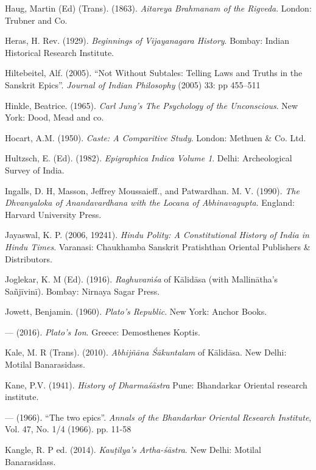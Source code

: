 \begin{thebibliography}{99}
Haug, Martin (Ed) (Trans). (1863). {\sl Aitareya Brahmanam of the Rigveda}. London: Trubner and Co. 

Heras, H. Rev. (1929). {\sl Beginnings of Vijayanagara History}. Bombay: Indian Historical Research Institute. 

Hiltebeitel, Alf. (2005). “Not Without Subtales: Telling Laws and Truths in the Sanskrit Epics”. {\sl Journal 
of Indian Philosophy} (2005) 33: pp 455–511

Hinkle, Beatrice. (1965). {\sl Carl Jung’s The Psychology of the Unconscious}. New York: Dood, Mead and co. 

Hocart, A.M. (1950). {\sl Caste: A Comparitive Study}. London: Methuen \& Co. Ltd. 

Hultzsch, E. (Ed). (1982). {\sl Epigraphica Indica Volume 1}. Delhi: Archeological Survey of India. 

Ingalls, D. H,  Masson, Jeffrey Moussaieff., and Patwardhan. M. V. (1990). {\sl The Dhvanyaloka of 
Anandavardhana with the Locana of Abhinavagupta}. England: Harvard University Press. 

Jayaswal, K. P. (2006, 19241). {\sl Hindu Polity: A Constitutional History of India in Hindu Times}. Varanasi: Chaukhamba Sanskrit Pratishthan Oriental Publishers \& Distributors. 

Joglekar, K. M (Ed). (1916). {\sl Raghuvaṁśa} of Kālidāsa (with Mallinātha’s Sañjīvinī). Bombay: Nirnaya Sagar Press.  

Jowett, Benjamin. (1960). {\sl Plato’s Republic}. New York: Anchor Books. 

--- (2016). {\sl Plato’s Ion}. Greece: Demosthenes Koptis. 

Kale, M. R (Trans). (2010). {\sl Abhijñāna Śākuntalam} of Kālidāsa. New Delhi: Motilal Banarasidass. 

Kane, P.V. (1941). {\sl History of Dharmaśāstra} Pune: Bhandarkar Oriental research institute. 

--- (1966). “The two epics”. {\sl Annals of the Bhandarkar Oriental Research Institute}, Vol. 47, No. 1/4 (1966). pp. 11-58 

Kangle, R. P ed. (2014). {\sl Kauṭilya’s Artha-śāstra}. New Delhi: Motilal Banarasidass. 


\end{thebibliography}
